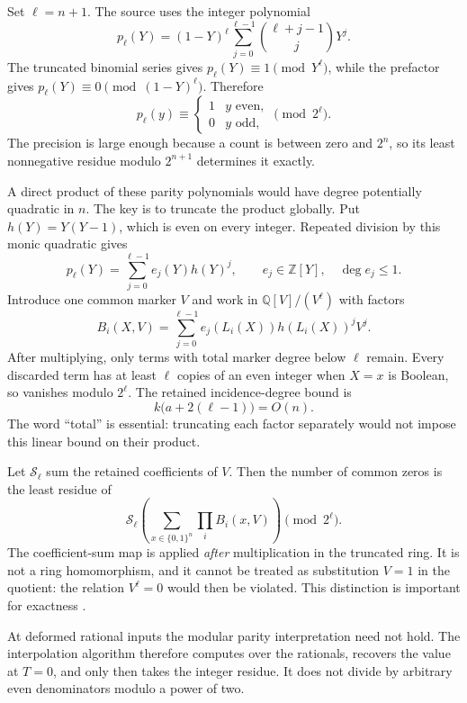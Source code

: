 \documentclass[11pt,a4paper]{article}
\numberwithin{equation}{section}
\theoremstyle{definition}
\theoremstyle{remark}
\newcommand{\Q}{\mathbb Q}
\newcommand{\Z}{\mathbb Z}
\begin{document}
Set $\ell=n+1$. The source uses the integer polynomial
\begin{equation}\label{eq:paritypoly}
 p_\ell(Y)=(1-Y)^\ell
        \sum_{j=0}^{\ell-1}\binom{\ell+j-1}{j}Y^j.
\end{equation}
The truncated binomial series gives $p_\ell(Y)\equiv1\pmod{Y^\ell}$, while
the prefactor gives $p_\ell(Y)\equiv0\pmod{(1-Y)^\ell}$. Therefore
\[
 p_\ell(y)\equiv
 \begin{cases}1&y\text{ even},\\0&y\text{ odd},\end{cases}
 \pmod{2^\ell}.
\]
The precision is large enough because a count is between zero and $2^n$, so
its least nonnegative residue modulo $2^{n+1}$ determines it exactly.

A direct product of these parity polynomials would have degree potentially
quadratic in $n$. The key is to truncate the product globally. Put
$h(Y)=Y(Y-1)$, which is even on every integer. Repeated division by this monic
quadratic gives
\begin{equation}\label{eq:paritybasis}
 p_\ell(Y)=\sum_{j=0}^{\ell-1}e_j(Y)h(Y)^j,
 \qquad e_j\in\Z[Y],\quad\deg e_j\le1.
\end{equation}
Introduce one common marker $V$ and work in $\Q[V]/(V^\ell)$ with factors
\[
 B_i(X,V)=\sum_{j=0}^{\ell-1}e_j(L_i(X))h(L_i(X))^jV^j.
\]
After multiplying, only terms with total marker degree below $\ell$ remain.
Every discarded term has at least $\ell$ copies of an even integer when
$X=x$ is Boolean, so vanishes modulo $2^\ell$. The retained incidence-degree
bound is
\begin{equation}\label{eq:totaldegree}
 k\bigl(a+2(\ell-1)\bigr)=O(n).
\end{equation}
The word ``total'' is essential: truncating each factor separately would not
impose this linear bound on their product.

Let $\mathcal S_\ell$ sum the retained coefficients of $V$. Then the number of
common zeros is the least residue of
\[
 \mathcal S_\ell\left(\sum_{x\in\{0,1\}^n}\prod_iB_i(x,V)\right)
 \pmod{2^\ell}.
\]
The coefficient-sum map is applied \emph{after} multiplication in the
truncated ring. It is not a ring homomorphism, and it cannot be treated as
substitution $V=1$ in the quotient: the relation $V^\ell=0$ would then be
violated. This distinction is important for exactness \cite{paper}.

At deformed rational inputs the modular parity interpretation need not hold.
The interpolation algorithm therefore computes over the rationals, recovers
the value at $T=0$, and only then takes the integer residue. It does not divide
by arbitrary even denominators modulo a power of two.
\end{document}
